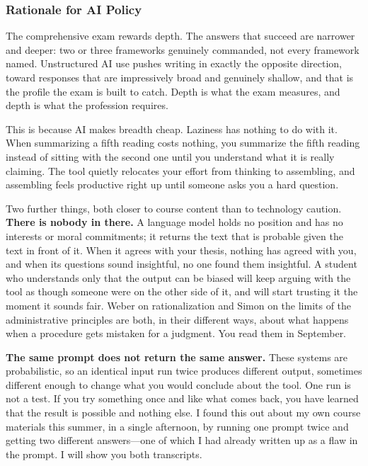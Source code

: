 \documentclass[11pt]{article}     %
\begin{document}
\subsubsection*{Rationale for AI Policy}

The comprehensive exam rewards depth. The answers that succeed are narrower and deeper: two or three frameworks genuinely commanded, not every framework named. Unstructured AI use pushes writing in exactly the opposite direction, toward responses that are impressively broad and genuinely shallow, and that is the profile the exam is built to catch. Depth is what the exam measures, and depth is what the profession requires.

\vspace{0.5em}
\noindent This is because AI makes breadth cheap. Laziness has nothing to do with it. When summarizing a fifth reading costs nothing, you summarize the fifth reading instead of sitting with the second one until you understand what it is really claiming. The tool quietly relocates your effort from thinking to assembling, and assembling feels productive right up until someone asks you a hard question.

\vspace{0.5em}
\noindent Two further things, both closer to course content than to technology caution. \textbf{There is nobody in there.} A language model holds no position and has no interests or moral commitments; it returns the text that is probable given the text in front of it. When it agrees with your thesis, nothing has agreed with you, and when its questions sound insightful, no one found them insightful. A student who understands only that the output can be biased will keep arguing with the tool as though someone were on the other side of it, and will start trusting it the moment it sounds fair. Weber on rationalization and Simon on the limits of the administrative principles are both, in their different ways, about what happens when a procedure gets mistaken for a judgment. You read them in September.

\vspace{0.5em}
\noindent \textbf{The same prompt does not return the same answer.} These systems are probabilistic, so an identical input run twice produces different output, sometimes different enough to change what you would conclude about the tool. One run is not a test. If you try something once and like what comes back, you have learned that the result is possible and nothing else. I found this out about my own course materials this summer, in a single afternoon, by running one prompt twice and getting two different answers---one of which I had already written up as a flaw in the prompt. I will show you both transcripts.
\end{document}
